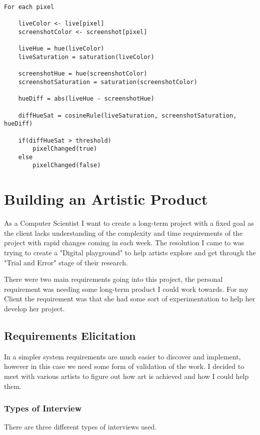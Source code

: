 \documentclass[a4paper]{report}
\begin{document}
\begin{lstlisting}
For each pixel

    liveColor <- live[pixel]
    screenshotColor <- screenshot[pixel]
    
    liveHue = hue(liveColor)
    liveSaturation = saturation(liveColor)
    
    screenshotHue = hue(screenshotColor)
    screenshotSaturation = saturation(screenshotColor)
    
    hueDiff = abs(liveHue - screenshotHue)
    
    diffHueSat = cosineRule(liveSaturation, screenshotSaturation, hueDiff)
    
    if(diffHueSat > threshold)
    	pixelChanged(true)
    else
    	pixelChanged(false)
\end{lstlisting}

\section{Building an Artistic Product}
As a Computer Scientist I want to create a long-term project with a fixed goal as the client lacks understanding of the complexity and time requirements of the project with rapid changes coming in each week. The resolution I came to was trying to create a "Digital playground" to help artists explore and get through the "Trial and Error" stage of their research.

There were two main requirements going into this project, the personal requirement was needing some long-term product I could work towards. For my Client the requirement was that she had some sort of experimentation to help her develop her project.

\subsection{Requirements Elicitation}
In a simpler system requirements are much easier to discover and implement, however in this case we need some form of validation of the work. I decided to meet with various artists to figure out how art is achieved and how I could help them.

\subsubsection{Types of Interview}
There are three different types of interviews used.
\end{document}
